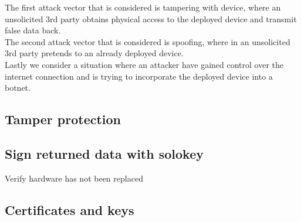 \documentclass[../../main.tex]{subfiles}
\begin{document}
The first attack vector that is considered is tampering with device, where an 
unsolicited 3rd party obtains physical access to the deployed device and
transmit false data back.\\

The second attack vector that is considered is spoofing, where in an unsolicited 3rd
party pretends to an already deployed device.\\

Lastly we consider a situation where an attacker have gained control over the
internet connection and is trying to incorporate the deployed device into a botnet.


\subsection{Tamper protection}%
\label{sub:tamper_protection}



\subsection{Sign returned data with solokey}%
\label{sub:sign_returned_data_with_solokey}

Verify hardware has not been replaced

\subsection{Certificates and keys}%
\label{sub:certificates_and_keys}



	
\end{document}
